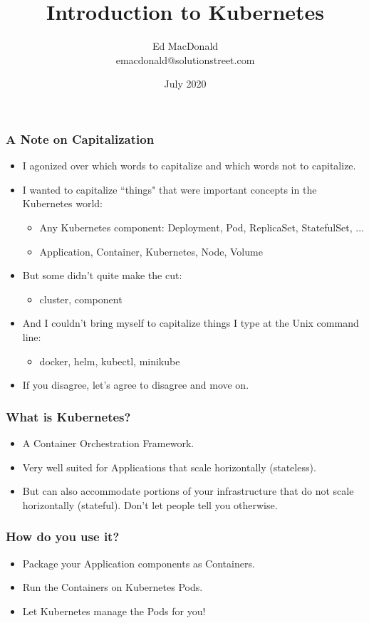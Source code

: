 \documentclass{beamer}
\title[Kubernetes]{Introduction to Kubernetes}
\author[Ed MacDonald]{Ed MacDonald\\emacdonald@solutionstreet.com}
\institute[\href{https://solutionstreet.com}{SolutionStreet}]{SolutionStreet\\\href{https://solutionstreet.com}{(solutionstreet.com)}}
\date{July 2020}
\begin{document}
\frame{\titlepage}

\begin{frame}
\frametitle{A Note on Capitalization}
\begin{itemize}
   \item{I agonized over which words to capitalize and which words not to capitalize.}

   \item{I wanted to capitalize ``things" that were important concepts in the Kubernetes world:}
   \begin{itemize}
      \item{Any Kubernetes component: Deployment, Pod, ReplicaSet, StatefulSet, ...}
      \item{Application, Container, Kubernetes, Node, Volume}
   \end{itemize}

   \item{But some didn't quite make the cut:}
   \begin{itemize}
      \item{cluster, component}
   \end{itemize}

   \item{And I couldn't bring myself to capitalize things I type at the Unix command line:}
   \begin{itemize}
      \item{docker, helm, kubectl, minikube}
   \end{itemize}

   \item{If you disagree, let's agree to disagree and move on.}
\end{itemize}
\end{frame}

\begin{frame}
\frametitle{What is Kubernetes?}
\begin{itemize}
    \item{A Container Orchestration Framework.}
    \item{Very well suited for Applications that scale horizontally (stateless).}
    \item{But can also accommodate portions of your infrastructure that do not scale horizontally (stateful). Don't let people tell you otherwise.}
\end{itemize}
\end{frame}

\begin{frame}
    \frametitle{How do you use it?}
    \begin{itemize}
        \item{Package your Application components as Containers.}
        \item{Run the Containers on Kubernetes Pods.}
        \item{Let Kubernetes manage the Pods for you!}
    \end{itemize}
\end{frame}
\end{document}
